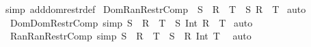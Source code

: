 \begin{isabellebody}
%
\isadelimproof
%
\endisadelimproof
%
\isatagproof
{}\isamarkupfalse%
{\isacharparenleft}simp\ add{\isacharcolon}dom{\isacharunderscore}restr{\isacharunderscore}def{\isacharparenright}%
\endisatagproof
{\isafoldproof}%
%
\isadelimproof
\isanewline
%
\endisadelimproof
\isanewline
\isanewline
{}\isamarkupfalse%
\ Dom{\isacharunderscore}Ran{\isacharunderscore}Restr{\isacharunderscore}Comp\ {\isacharcolon}\ {\isachardoublequoteopen}{\isacharparenleft}{\isacharparenleft}S\ {\isacharless}{\isacharcolon}\ R{\isacharparenright}\ {\isacharcolon}{\isachargreater}\ T{\isacharparenright}\ {\isacharequal}\ {\isacharparenleft}S{\isacharless}{\isacharcolon}\ {\isacharparenleft}R\ {\isacharcolon}{\isachargreater}\ T{\isacharparenright}{\isacharparenright}{\isachardoublequoteclose}\isanewline
%
\isadelimproof
%
\endisadelimproof
%
\isatagproof
{}\isamarkupfalse%
\ auto\isanewline
{}\isamarkupfalse%
%
\endisatagproof
{\isafoldproof}%
%
\isadelimproof
\isanewline
%
\endisadelimproof
\isanewline
{}\isamarkupfalse%
\ Dom{\isacharunderscore}Dom{\isacharunderscore}Restr{\isacharunderscore}Comp\ {\isacharbrackleft}simp{\isacharbrackright}{\isacharcolon}\ {\isachardoublequoteopen}{\isacharparenleft}S\ {\isacharless}{\isacharcolon}\ {\isacharparenleft}R\ {\isacharless}{\isacharcolon}\ T{\isacharparenright}{\isacharparenright}\ {\isacharequal}\ {\isacharparenleft}{\isacharparenleft}S\ Int\ R{\isacharparenright}\ {\isacharless}{\isacharcolon}\ T{\isacharparenright}{\isachardoublequoteclose}\isanewline
%
\isadelimproof
%
\endisadelimproof
%
\isatagproof
{}\isamarkupfalse%
\ auto\isanewline
{}\isamarkupfalse%
%
\endisatagproof
{\isafoldproof}%
%
\isadelimproof
\isanewline
%
\endisadelimproof
\isanewline
{}\isamarkupfalse%
\ Ran{\isacharunderscore}Ran{\isacharunderscore}Restr{\isacharunderscore}Comp\ {\isacharbrackleft}simp{\isacharbrackright}{\isacharcolon}\ {\isachardoublequoteopen}{\isacharparenleft}{\isacharparenleft}S\ {\isacharcolon}{\isachargreater}\ R{\isacharparenright}\ {\isacharcolon}{\isachargreater}\ T{\isacharparenright}\ {\isacharequal}\ {\isacharparenleft}S\ {\isacharcolon}{\isachargreater}\ {\isacharparenleft}R\ Int\ T{\isacharparenright}{\isacharparenright}\ {\isachardoublequoteclose}\isanewline
%
\isadelimproof
%
\endisadelimproof
%
\isatagproof
{}\isamarkupfalse%
\ auto\isanewline
{}\isamarkupfalse%
%
\endisatagproof
{\isafoldproof}%
%
\isadelimproof
\isanewline
%
\endisadelimproof
\isanewline
\isanewline
{}\isamarkupfalse%

\end{isabellebody}
